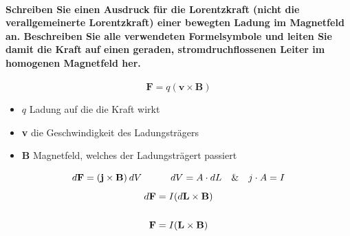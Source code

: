 \documentclass[a4paper, 11pt, ngerman, parskip=half]{scrartcl}
\begin{document}
\paragraph{Schreiben Sie einen Ausdruck für die Lorentzkraft (nicht die verallgemeinerte
Lorentzkraft) einer bewegten Ladung im Magnetfeld an. Beschreiben Sie alle verwendeten Formelsymbole
und leiten Sie damit die Kraft auf einen geraden, stromdruchflossenen Leiter im homogenen Magnetfeld
her.}
\begin{equation}
    \textbf{F} = q(\textbf{v} \times \textbf{B})
\end{equation}
\begin{itemize}
    \item $q$ Ladung auf die die Kraft wirkt 
    \item \textbf{v} die Geschwindigkeit des Ladungsträgers
    \item \textbf{B} Magnetfeld, welches der Ladungsträgert passiert
\end{itemize}
\begin{equation}
    d\textbf{F} = (\textbf{j} \times \textbf{B})\hspace{0.2em} dV \hspace{3em} dV = A\cdot dL \hspace{1em}\& \hspace{1em} j \cdot A = I
\end{equation}
\begin{align}
    d\textbf{F} &= I (d\textbf{L} \times \textbf{B})  \\
    \notag \\ 
    \textbf{F} &= I (\textbf{L} \times \textbf{B})
\end{align}
\end{document}

